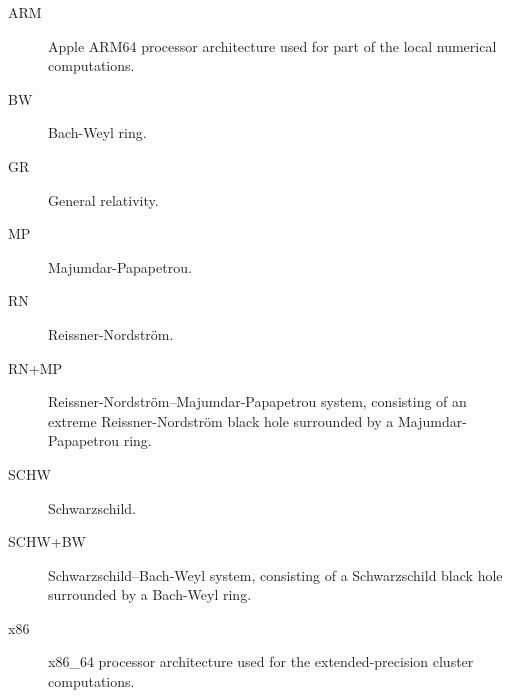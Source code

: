 \documentclass[12pt,a4paper]{report}
\begin{document}




\tableofcontents











\listoffigures

\listoftables


\begin{description}
    \item[ARM] Apple ARM64 processor architecture used for part of the local numerical computations.
    \item[BW] Bach-Weyl ring.
    \item[GR] General relativity.
    \item[MP] Majumdar-Papapetrou.
    \item[RN] Reissner-Nordstr\"om.
    \item[RN+MP] Reissner-Nordstr\"om--Majumdar-Papapetrou system, consisting of an extreme Reissner-Nordstr\"om black hole surrounded by a Majumdar-Papapetrou ring.
    \item[SCHW] Schwarzschild.
    \item[SCHW+BW] Schwarzschild--Bach-Weyl system, consisting of a Schwarzschild black hole surrounded by a Bach-Weyl ring.
    \item[x86] x86\_64 processor architecture used for the extended-precision cluster computations.
\end{description}

\ifx\ThesisType\TypePhD
{}
\fi

\end{document}
